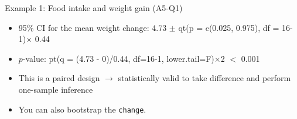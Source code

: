 \documentclass{beamer}\usepackage[]{graphicx}\usepackage[]{color}
\newenvironment{knitrout}{}{} %
\begin{document}
\begin{frame}[fragile]{Example 1: Food intake and weight gain (A5-Q1)}
\begin{minipage}{0.47\textwidth}
\begin{knitrout}
\end{knitrout}

\end{minipage}
\begin{minipage}{0.5\textwidth}
	\pause 
\begin{itemize}
	\small
	\setlength\itemsep{1em}
	\item 95\% CI for the mean weight change: 4.73 $\pm$ qt(p = c(0.025, 0.975), df = 16-1)$\times$ 0.44 
	\item $p$-value: pt(q = (4.73 - 0)/0.44, df=16-1, lower.tail=F)$\times$2 $<$ 0.001 
	\item This is a paired design $\to$ statistically valid to take difference and perform one-sample inference
	\item You can also bootstrap the \texttt{change}.
\end{itemize}
\end{minipage}

\end{frame}
\end{document}
